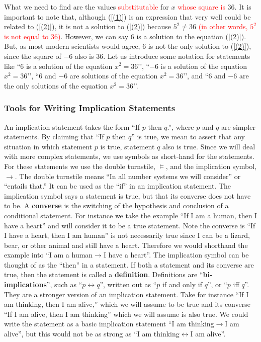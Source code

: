 \documentclass{book}
\theoremstyle{definition}
\begin{document}
What we need to find are the values \textcolor{red}{substitutable} for $x$ \textcolor{red}{whose square is} $36$. It is important to note that, although (\ref{(1)}) is an expression that very well could be related to (\ref{(2)}), it is not a solution to (\ref{(2)}) because $5^2\ne36$  \textcolor{red}{(in other words, $5^2$ is not equal to $36$)}. However, we can say $6$ is a solution to the equation (\ref{(2)}).  But, as most modern scientists would agree, $6$ is not the only solution to (\ref{(2)}), since the square of $-6$ also is $36$.  Let us introduce some notation for statements like ``$6$ is a solution of the equation $x^2=36$’’, ``$-6$ is a solution of the equation $x^2=36$’’, ``$6$ and $-6$ are solutions of the equation $x^2=36$’’, and ``$6$ and $-6$ are the only solutions of the equation $x^2=36$’’.

\subsubsection{Tools for Writing Implication Statements}

An implication statement takes the form ``If $p$ then $q$.'', where $p$ and $q$ are simpler statements.  By claiming that  ``If $p$ then $q$'' is true, we mean to assert that any situation in which statement $p$ is true, statement $q$ also is true.
Since we will deal with more complex statements, we use symbols as short-hand for the statements. For these statements we use the double turnstile, $\models$, and the implication symbol, $\rightarrow$. The double turnstile means ``In all number systems we will consider'' or ``entails that.'' It can be used as the ``if'' in an implication statement. The implication symbol says a statement is true, but that its converse does not have to be. A {\bf converse} is the switching of the hypothesis and conclusion of a conditional statement. For instance we take the example ``If I am a human, then I have a heart'' and will consider it to be a true statement. Note the converse is ``If I have a heart, then I am human'' is not necessarily true since I can be a lizard, bear, or other animal and still have a heart. Therefore we would shorthand the example into ``I am a human$\rightarrow$I have a heart''. The implication symbol can be thought of as the ``then'' in a statement. If both a statement and its converse are true, then the statement is called a {\bf definition}. 
Definitions are ``{\bf bi-implications}'', such as ``$p \leftrightarrow q$'', written out as ``$p$ if and only if $q$'', or ``$p$ iff $q$''. They are a stronger version of an implication statement. Take for instance ``If I am thinking, then I am alive,'' which we will assume to be true and its converse ``If I am alive, then I am thinking'' which we will assume is also true. We could write the statement as a basic implication statement ``I am thinking$\rightarrow$I am alive'', but this would not be as strong as ``I am thinking$\leftrightarrow$I am alive''.   
\end{document}
